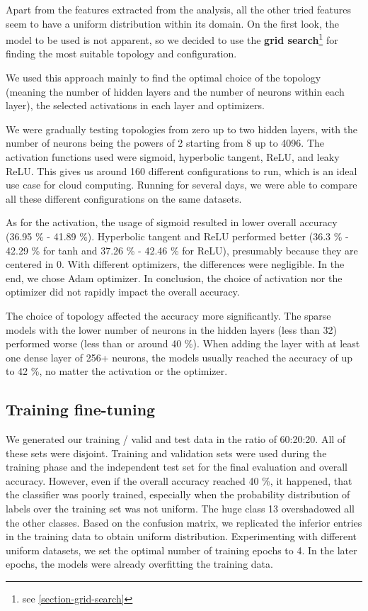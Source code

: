 Apart from the features extracted from the analysis, all the other tried features seem to have a uniform distribution within its domain. On the first look, the model to be used is not apparent, so we decided to use the \textbf{grid search}\footnote{see \autoref{section-grid-search}} for finding the most suitable topology and configuration. 

We used this approach mainly to find the optimal choice of the topology (meaning the number of hidden layers and the number of neurons within each layer), the selected activations in each layer and optimizers.

We were gradually testing topologies from zero up to two hidden layers, with the number of neurons being the powers of 2 starting from 8 up to 4096. The activation functions used were sigmoid, hyperbolic tangent, ReLU, and leaky ReLU. This gives us around 160 different configurations to run, which is an ideal use case for cloud computing. Running for several days, we were able to compare all these different configurations on the same datasets.

As for the activation, the usage of sigmoid resulted in lower overall accuracy (36.95 \% - 41.89 \%). Hyperbolic tangent and ReLU performed better (36.3 \% - 42.29 \% for tanh and 37.26 \% - 42.46 \% for ReLU), presumably because they are centered in 0. With different optimizers, the differences were negligible. In the end, we chose Adam optimizer. In conclusion, the choice of activation nor the optimizer did not rapidly impact the overall accuracy. 

The choice of topology affected the accuracy more significantly. The sparse models with the lower number of neurons in the hidden layers (less than 32) performed worse (less than or around 40 \%). When adding the layer with at least one dense layer of 256+ neurons, the models usually reached the accuracy of up to 42 \%, no matter the activation or the optimizer.

\subsection*{Training fine-tuning}

We generated our training / valid and test data in the ratio of 60:20:20. All of these sets were disjoint. Training and validation sets were used during the training phase and the independent test set for the final evaluation and overall accuracy. However, even if the overall accuracy reached 40 \%, it happened, that the classifier was poorly trained, especially when the probability distribution of labels over the training set was not uniform. The huge class 13 overshadowed all the other classes. Based on the confusion matrix, we replicated the inferior entries in the training data to obtain uniform distribution. Experimenting with different uniform datasets, we set the optimal number of training epochs to 4. In the later epochs, the models were already overfitting the training data.

